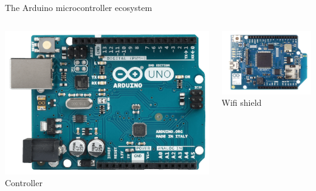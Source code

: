 \documentclass[compress]{beamer}
\begin{document}
\begin{frame}{The Arduino microcontroller ecosystem}
    \begin{columns}
        \begin{column}{0.3\linewidth}
            \begin{center}
                \includegraphics[width=\linewidth]{arduino-uno}\\
                Controller
            \end{center}
        \end{column}
        \begin{column}{0.3\linewidth}
            \begin{center}
                \includegraphics[width=\linewidth]{wifi-shield}\\
                Wifi shield
            \end{center}


\end{column}
\end{columns}
\end{frame}
\end{document}
